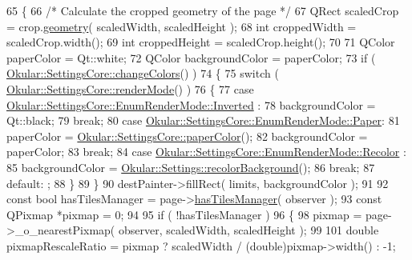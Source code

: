 \begin{DoxyCode}
65 \{
66     \textcolor{comment}{/* Calculate the cropped geometry of the page */}
67     QRect scaledCrop = crop.\hyperlink{classOkular_1_1NormalizedRect_a006897c5fcff2c3a97b4141f1a967513}{geometry}( scaledWidth, scaledHeight );
68     \textcolor{keywordtype}{int} croppedWidth = scaledCrop.width();
69     \textcolor{keywordtype}{int} croppedHeight = scaledCrop.height();
70 
71     QColor paperColor = Qt::white;
72     QColor backgroundColor = paperColor;
73     \textcolor{keywordflow}{if} ( \hyperlink{classOkular_1_1SettingsCore_af01449e331a4e973d5cb3879a3e76081}{Okular::SettingsCore::changeColors}() )
74     \{
75         \textcolor{keywordflow}{switch} ( \hyperlink{classOkular_1_1SettingsCore_a6fcb9ee5ad7a92b49ad31344771cca2d}{Okular::SettingsCore::renderMode}() )
76         \{
77             \textcolor{keywordflow}{case} \hyperlink{classOkular_1_1SettingsCore_1_1EnumRenderMode_aae172bdb345dda4d639e763709ea357aae3a52d8c06b668f28a3f3d646c49d3b0}{Okular::SettingsCore::EnumRenderMode::Inverted}
      :
78                 backgroundColor = Qt::black;
79                 \textcolor{keywordflow}{break};
80             \textcolor{keywordflow}{case} \hyperlink{classOkular_1_1SettingsCore_1_1EnumRenderMode_aae172bdb345dda4d639e763709ea357aa58af23c7fbd8ea1998995a8eaffa125d}{Okular::SettingsCore::EnumRenderMode::Paper}:
81                 paperColor = \hyperlink{classOkular_1_1SettingsCore_ab59e5e75137763e3a97b545dcfd2bb30}{Okular::SettingsCore::paperColor}();
82                 backgroundColor = paperColor;
83                 \textcolor{keywordflow}{break};
84             \textcolor{keywordflow}{case} \hyperlink{classOkular_1_1SettingsCore_1_1EnumRenderMode_aae172bdb345dda4d639e763709ea357aa4ed9520dc788e5254440ebd166aedbd8}{Okular::SettingsCore::EnumRenderMode::Recolor}
      :
85                 backgroundColor = \hyperlink{classOkular_1_1Settings_a3b5300e5e203a1d4e9d08b2edfe4f152}{Okular::Settings::recolorBackground}();
86                 \textcolor{keywordflow}{break};
87             \textcolor{keywordflow}{default}: ;
88         \}
89     \}
90     destPainter->fillRect( limits, backgroundColor );
91 
92     \textcolor{keyword}{const} \textcolor{keywordtype}{bool} hasTilesManager = page->\hyperlink{classOkular_1_1Page_adc0913df4b9c04bae5612e9861673bb5}{hasTilesManager}( observer );
93     \textcolor{keyword}{const} QPixmap *pixmap = 0;
94 
95     \textcolor{keywordflow}{if} ( !hasTilesManager )
96     \{
98         pixmap = page->\_o\_nearestPixmap( observer, scaledWidth, scaledHeight );
99 
101         \textcolor{keywordtype}{double} pixmapRescaleRatio = pixmap ? scaledWidth / (double)pixmap->width() : -1;

\end{DoxyCode}
